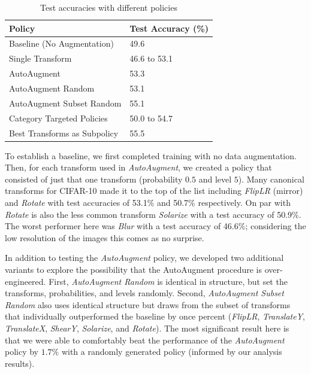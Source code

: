 \documentclass[10pt,twocolumn,letterpaper]{article}
\begin{document}
		\begin{table}[h]
			\begin{tabular}{l|l}
				\hline
				Policy  						&Test Accuracy (\%)   \\ \hline
				Baseline (No Augmentation)  	&49.6 \\
				Single Transform				&46.6 to 53.1 \\
				AutoAugment 					&53.3 \\ 
				AutoAugment Random				&53.1 \\	
				AutoAugment Subset Random 		&55.1 \\
				Category Targeted Policies   	&50.0 to 54.7 \\
				Best Transforms as Subpolicy 	&55.5
			\end{tabular}
			\caption{Test accuracies with different policies}
		\end{table}
		
		To establish a baseline, we first completed training with no data augmentation. Then, for each transform used in \textit{AutoAugment}, we created a policy that consisted of just that one transform (probability $0.5$ and level $5$). Many canonical transforms for CIFAR-10 made it to the top of the list including \textit{FlipLR} (mirror) and \textit{Rotate} with test accuracies of 53.1\% and 50.7\% respectively. On par with \textit{Rotate} is also the less common transform \textit{Solarize} with a test accuracy of 50.9\%. The worst performer here was \textit{Blur} with a test accuracy of 46.6\%; considering the low resolution of the images this comes as no surprise. 
		
		In addition to testing the \textit{AutoAugment} policy, we developed two additional variants to explore the possibility that the AutoAugment procedure is over-engineered. First, \textit{AutoAugment Random} is identical in structure, but set the transforms, probabilities, and levels randomly. Second, \textit{AutoAugment Subset Random} also uses identical structure but draws from the subset of transforms that individually outperformed the baseline by once percent (\textit{FlipLR}, \textit{TranslateY}, \textit{TranslateX}, \textit{ShearY}, \textit{Solarize}, and \textit{Rotate}). The most significant result here is that we were able to comfortably beat the performance of the \textit{AutoAugment} policy by $1.7\%$ with a randomly generated policy (informed by our analysis results).
		
\end{document}
